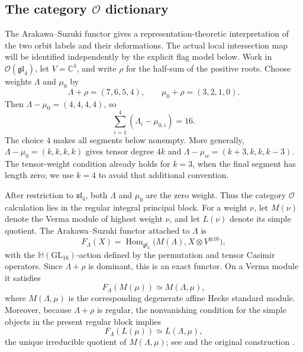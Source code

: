 \documentclass[11pt]{amsart}
\theoremstyle{definition}
\theoremstyle{remark}
\newcommand{\Hh}{\mathbb H}
\begin{document}

\subsection{The category \texorpdfstring{$\mathcal O$}{O} dictionary}

The Arakawa--Suzuki functor gives a representation-theoretic
interpretation of the two orbit labels and their deformations.
The actual local intersection map will be identified independently by
the explicit flag model below.
Work in $\mathcal O(\mathfrak{gl}_4)$, let
$V=\mathbb C^4$, and write $\rho$ for the half-sum of the positive roots.
Choose weights $\Lambda$ and $\mu_0$ by
\begin{equation}\label{eq:appendix-AS-weights}
 \Lambda+\rho=(7,6,5,4),
 \qquad
 \mu_0+\rho=(3,2,1,0).
\end{equation}
Then $\Lambda-\mu_0=(4,4,4,4)$, so
\[
 \sum_{i=1}^4(\Lambda_i-\mu_{0,i})=16.
\]
The choice $4$ makes all segments below nonempty.  More generally,
$\Lambda-\mu_0=(k,k,k,k)$ gives tensor degree $4k$ and
$\Lambda-\mu_w=(k+3,k,k,k-3)$.  The tensor-weight condition already
holds for $k=3$, when the final segment has length zero; we use $k=4$
to avoid that additional convention.

After restriction to $\mathfrak{sl}_4$, both $\Lambda$ and $\mu_0$ are the
zero weight.  Thus the category $\mathcal O$ calculation lies in the regular
integral principal block. %
 For a weight $\nu$, let $M(\nu)$ denote the Verma module of highest weight
$\nu$, and let $L(\nu)$ denote its simple quotient.  The Arakawa--Suzuki
functor attached to $\Lambda$ is
\[
 F_\Lambda(X)=
 \operatorname{Hom}_{\mathfrak{gl}_4}
 \bigl(M(\Lambda),X\otimes V^{\otimes16}\bigr),
\]
with the $\Hh(\mathrm{GL}_{16})$-action defined by the permutation and tensor
Casimir operators.  Since $\Lambda+\rho$ is dominant, this is an exact
functor.  On a Verma module it satisfies
\begin{equation}\label{eq:appendix-AS-standard}
 F_\Lambda(M(\mu))\simeq M(\Lambda,\mu),
\end{equation}
where $M(\Lambda,\mu)$ is the corresponding degenerate affine Hecke
standard module.  Moreover, because $\Lambda+\rho$ is regular, the
nonvanishing condition for the simple objects in the present regular block
implies
\begin{equation}\label{eq:appendix-AS-simple}
 F_\Lambda(L(\mu))\simeq L(\Lambda,\mu),
\end{equation}
the unique irreducible quotient of $M(\Lambda,\mu)$; see
\cite[Sections~2.2 and~3.1--3.2]{Suzuki} and the original construction
\cite{ArakawaSuzuki}.
\end{document}
